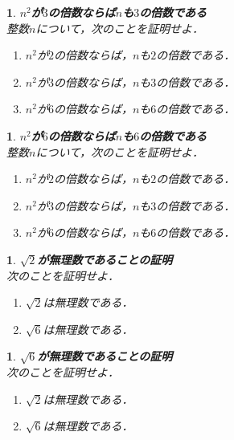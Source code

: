 \documentclass[10pt,
fleqn,
dvipdfmx,
uplatex
]{jsarticle}
\newtheorem{question}[Question]{}
\begin{document}
\begin{question}{\bf\boldmath $n^2$が$3$の倍数ならば$n$も$3$の倍数である}\\
整数$n$について，次のことを証明せよ．
\begin{enumerate}
\item $n^2$が$2$の倍数ならば，$n$も$2$の倍数である．
\item $n^2$が$3$の倍数ならば，$n$も$3$の倍数である．
\item $n^2$が$6$の倍数ならば，$n$も$6$の倍数である．
\end{enumerate}

\end{question}



\begin{question}{\bf\boldmath $n^2$が$6$の倍数ならば$n$も$6$の倍数である}\\
整数$n$について，次のことを証明せよ．
\begin{enumerate}
\item $n^2$が$2$の倍数ならば，$n$も$2$の倍数である．
\item $n^2$が$3$の倍数ならば，$n$も$3$の倍数である．
\item $n^2$が$6$の倍数ならば，$n$も$6$の倍数である．
\end{enumerate}

\end{question}



\begin{question}{\bf\boldmath $\sqrt 2$が無理数であることの証明}\\
次のことを証明せよ．
\begin{enumerate}
\item $\sqrt 2$は無理数である．
\item $\sqrt 6$は無理数である．
\end{enumerate}

\end{question}



\begin{question}{\bf\boldmath $\sqrt 6$が無理数であることの証明}\\
次のことを証明せよ．
\begin{enumerate}
\item $\sqrt 2$は無理数である．
\item $\sqrt 6$は無理数である．
\end{enumerate}

\end{question}
\end{document}
